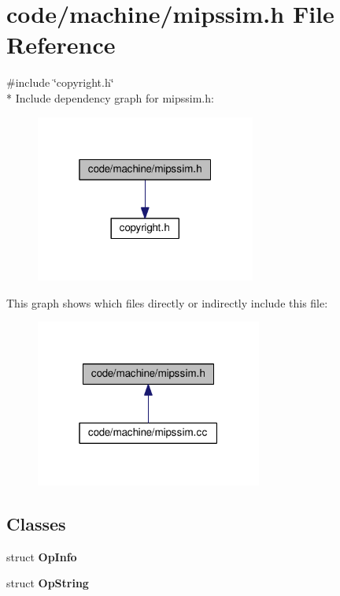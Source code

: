 \section{code/machine/mipssim.h File Reference}
\label{mipssim_8h}
{\ttfamily \#include \char`\"{}copyright.\+h\char`\"{}}\\*
Include dependency graph for mipssim.\+h\+:
\nopagebreak
\begin{figure}[H]
\begin{center}
\leavevmode
\includegraphics[width=205pt]{mipssim_8h__incl}
\end{center}
\end{figure}
This graph shows which files directly or indirectly include this file\+:
\nopagebreak
\begin{figure}[H]
\begin{center}
\leavevmode
\includegraphics[width=211pt]{mipssim_8h__dep__incl}
\end{center}
\end{figure}
\subsection*{Classes}
\begin{DoxyCompactItemize}
\item 
struct {\bf Op\+Info}
\item 
struct {\bf Op\+String}
\end{DoxyCompactItemize}
